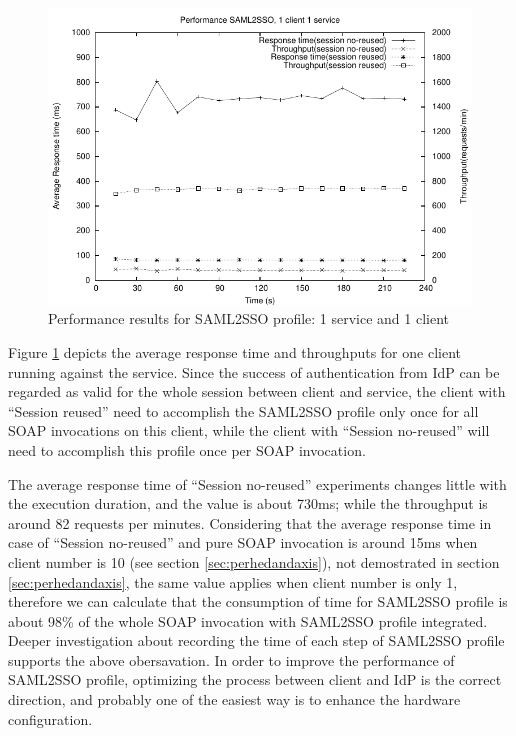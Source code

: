 \documentclass[conference]{IEEEtran}
\begin{document}
\begin{figure}
\includegraphics[width=0.9\columnwidth]{SAML2SSO_thread1.pdf}
\caption{Performance results for SAML2SSO profile: 1 service and 1 client}
\label{fig:SAML2SSO_thread1}
\end{figure}

Figure \ref{fig:SAML2SSO_thread1} depicts the average response time and throughputs for one client 
running against the service. Since the success of authentication from IdP can be regarded as 
valid for the whole session between client and service, the client with ``Session reused'' 
need to accomplish the SAML2SSO profile only once for all SOAP invocations on this client, 
while the client with ``Session no-reused'' will need to accomplish this profile once per 
SOAP invocation.

The average response time of ``Session no-reused'' experiments changes little with the execution 
duration, and the value is about 730ms; while the throughput is around 82 requests per minutes.
Considering that the average response time in case of 
``Session no-reused'' and pure SOAP invocation is around 15ms when client number is 10 (see section
\ref{sec:perhedandaxis}), not demostrated in section \ref{sec:perhedandaxis}, the same value applies 
when client number is only 1, therefore we can calculate that the consumption of time for 
SAML2SSO profile is about 98\% of the whole SOAP invocation with SAML2SSO profile integrated.
Deeper investigation about recording the time of each step of SAML2SSO profile supports the above
obersavation. In order to improve the performance of SAML2SSO profile, optimizing the process between
client and IdP is the correct direction, and probably one of the easiest way is to enhance the 
hardware configuration.
\end{document}

